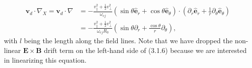 \documentclass[12pt]{article}
\numberwithin{equation}{subsection}
\begin{document}
   \begin{equation}
   \begin{aligned}
      \bm{v}_d\cdot\nabla_X = \bm{v}_d\cdot\nabla &= -\frac{v_\parallel^2 + \frac{1}{2}v_\perp^2}{\omega_{cj}}
      (\sin\theta\bm{\hat{e}}_r + \cos\theta\bm{\hat{e}}_\theta)
      \cdot(\partial_r\bm{\hat{e}}_r + \frac{1}{r}\partial_\theta\bm{\hat{e}}_\theta) \\
      &= -\frac{v_\parallel^2 + \frac{1}{2}v_\perp^2}{\omega_{cj}R_0}(\sin\theta\partial_r + \frac{\cos\theta}{r}\partial_\theta),
   \end{aligned}
   \end{equation}
with $l$ being the length along the field lines. Note that we have dropped the non-linear $\bm{E}\times\bm{B}$ drift term on the left-hand
side of (3.1.6) because we are interested in linearizing this equation.
\end{document}
